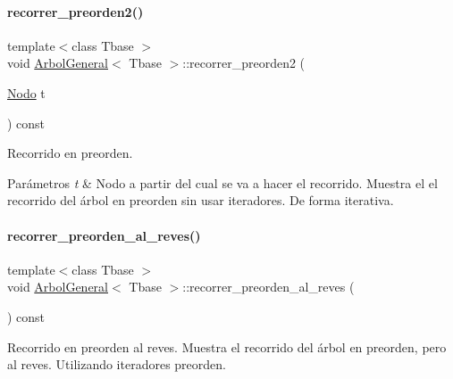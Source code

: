 \hypertarget{classArbolGeneral_a0a9d574133bfc5b80dc5136094692830}{}\label{classArbolGeneral_a0a9d574133bfc5b80dc5136094692830} 
\paragraph{\texorpdfstring{recorrer\+\_\+preorden2()}{recorrer\_preorden2()}}
{\footnotesize\ttfamily template$<$class Tbase $>$ \\
void \hyperlink{classArbolGeneral}{Arbol\+General}$<$ Tbase $>$\+::recorrer\+\_\+preorden2 (\begin{DoxyParamCaption}\item[{\hyperlink{classArbolGeneral_a12cc1b74a9095d89bc7334290d332f7a}{Nodo}}]{t }\end{DoxyParamCaption}) const}



Recorrido en preorden. 


\begin{DoxyParams}{Parámetros}
{\em t} & Nodo a partir del cual se va a hacer el recorrido.  Muestra el el recorrido del árbol en preorden sin usar iteradores. De forma iterativa. \\
\hline
\end{DoxyParams}
\hypertarget{classArbolGeneral_af9a135c995c5baf31400a07e03415fcf}{}\label{classArbolGeneral_af9a135c995c5baf31400a07e03415fcf} 
\paragraph{\texorpdfstring{recorrer\+\_\+preorden\+\_\+al\+\_\+reves()}{recorrer\_preorden\_al\_reves()}}
{\footnotesize\ttfamily template$<$class Tbase $>$ \\
void \hyperlink{classArbolGeneral}{Arbol\+General}$<$ Tbase $>$\+::recorrer\+\_\+preorden\+\_\+al\+\_\+reves (\begin{DoxyParamCaption}{ }\end{DoxyParamCaption}) const}



Recorrido en preorden al reves.  Muestra el recorrido del árbol en preorden, pero al reves. Utilizando iteradores preorden. 

